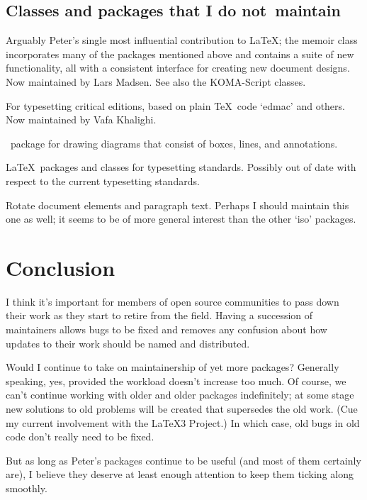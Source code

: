 \documentclass[final]{ltugboat}
\begin{document}
\subsection{Classes and packages that I do not~maintain}

\begin{description}[font=\normalfont\sffamily]
\item [memoir] Arguably Peter's single most influential contribution to \LaTeX; the \textsf{memoir} class incorporates
many of the packages mentioned above and contains a suite of new functionality, all with a consistent interface for creating new document designs.
Now maintained by Lars Madsen.
See also the \textsf{KOMA-Script} classes.
\item [ledmac/ledpar/ledarab]  For typesetting critical editions, based on plain \TeX\ code `\textsf{edmac}' and others. Now maintained by Vafa Khalighi.
\item [expressg] \MP\ package for drawing diagrams that consist of boxes, lines, and annotations.
\item [iso \& iso10303] \LaTeX\ packages and classes for typesetting  standards. Possibly out of date with respect to the current typesetting standards.
\item [isorot] Rotate document elements and paragraph text. Perhaps I should maintain this one as well; it seems to be of more general interest than the other `\textsf{iso}' packages.
\end{description}

\medskip
\section{Conclusion}

I think it's important for members of open source communities to pass down their work as they start to retire from the field. Having a succession of maintainers allows bugs to be fixed and removes any confusion about how updates to their work should be named and distributed.

Would I continue to take on maintainership of yet more packages? Generally speaking, yes, provided the workload doesn't increase too much. Of course, we can't continue working with older and older packages indefinitely; at some stage new solutions to old problems will be created that supersedes the old work. (Cue my current involvement with the \LaTeX3 Project.) In which case, old bugs in old code don't really need to be fixed.

But as long as Peter's packages continue to be useful (and most of them certainly are), I believe they deserve at least enough attention to keep them ticking along smoothly.

\medskip
\makesignature
\end{document}
